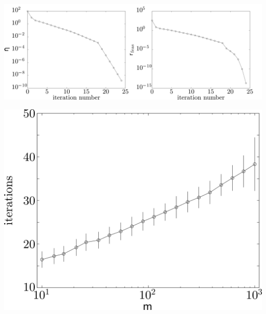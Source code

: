 \clearpage
\hfil\includegraphics[width=.5\textwidth]{../Graphics/614b.png}\hfil

\clearpage
\hfil\includegraphics[width=.5\textwidth]{../Graphics/615.png}\hfil


